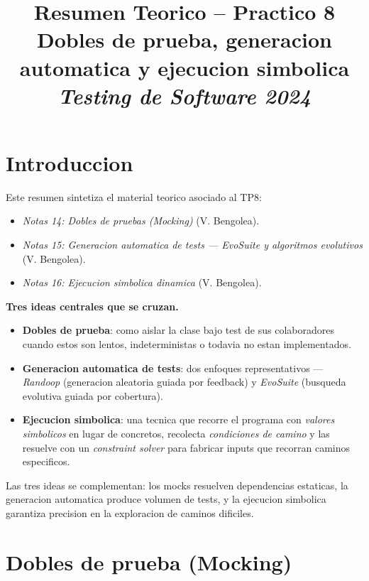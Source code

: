 \documentclass[12pt,a4paper]{article}
\title{\textbf{Resumen Teorico -- Practico 8}\\
Dobles de prueba, generacion automatica y ejecucion simbolica\\
\textit{Testing de Software 2024}}
\author{}
\date{}
\begin{document}
\maketitle
\tableofcontents
\newpage

\section*{Introduccion}

Este resumen sintetiza el material teorico asociado al TP8:

\begin{itemize}
  \item \textit{Notas 14: Dobles de pruebas (Mocking)} (V. Bengolea).
  \item \textit{Notas 15: Generacion automatica de tests --- EvoSuite y algoritmos
  evolutivos} (V. Bengolea).
  \item \textit{Notas 16: Ejecucion simbolica dinamica} (V. Bengolea).
\end{itemize}

\textbf{Tres ideas centrales que se cruzan.}

\begin{itemize}
  \item \textbf{Dobles de prueba}: como aislar la clase bajo test de sus colaboradores cuando
  estos son lentos, indeterministas o todavia no estan implementados.
  \item \textbf{Generacion automatica de tests}: dos enfoques representativos --- \emph{Randoop}
  (generacion aleatoria guiada por feedback) y \emph{EvoSuite} (busqueda evolutiva guiada por
  cobertura).
  \item \textbf{Ejecucion simbolica}: una tecnica que recorre el programa con \emph{valores
  simbolicos} en lugar de concretos, recolecta \emph{condiciones de camino} y las resuelve
  con un \emph{constraint solver} para fabricar inputs que recorran caminos especificos.
\end{itemize}

Las tres ideas se complementan: los mocks resuelven dependencias estaticas, la generacion
automatica produce volumen de tests, y la ejecucion simbolica garantiza precision en la
exploracion de caminos dificiles.

\section{Dobles de prueba (Mocking)}
\end{document}
